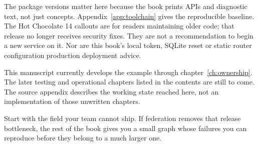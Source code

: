 The package versions matter here because the book prints APIs and diagnostic
text, not just concepts. Appendix~\ref{app:toolchain} gives the reproducible
baseline. The Hot Chocolate 14 callouts are for readers maintaining older
code; that release no longer receives security fixes. They are not a
recommendation to begin a new service on it. Nor are this book's local token,
SQLite reset or static router configuration production deployment advice.

This manuscript currently develops the example through
chapter~\ref{ch:ownership}. The later testing and operational chapters listed
in the contents are still to come. The source appendix describes the working
state reached here, not an implementation of those unwritten chapters.

Start with the field your team cannot ship. If federation removes that
release bottleneck, the rest of the book gives you a small graph whose
failures you can reproduce before they belong to a much larger one.
